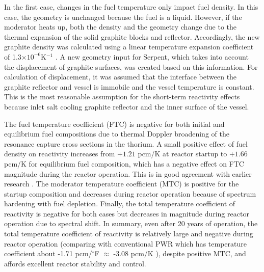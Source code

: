 In the first case, changes in the fuel temperature only impact fuel density. 
In this case, the geometry is unchanged because the fuel is a liquid. However, 
if the moderator heats up, both the density and the geometry change due to 
the thermal expansion of the solid graphite blocks and reflector. Accordingly, 
the new graphite density was calculated using a linear temperature expansion 
coefficient of 1.3$\times10^{-6}$K$^{-1}$ \cite{robertson_conceptual_1971}. A 
new geometry input for Serpent, which takes into account the displacement of 
graphite surfaces, was created based on this information. For calculation of 
displacement, it was assumed that the interface between the graphite reflector 
and vessel is immobile and the vessel temperature is constant. This 
is the most reasonable assumption for the short-term reactivity effects 
because inlet salt cooling graphite reflector and the inner surface of the 
vessel.

The fuel temperature coefficient (FTC) is negative for both initial and 
equilibrium fuel compositions due to thermal Doppler broadening of the 
resonance capture cross sections in the thorium. A small positive effect of 
fuel density on reactivity increases from $+1.21$ pcm/K at reactor startup to 
$+1.66$ pcm/K for equilibrium fuel composition, which has a negative effect on 
FTC magnitude during the reactor operation. This is in good agreement with 
earlier research \cite{robertson_conceptual_1971,park_whole_2015}. The 
moderator temperature coefficient (MTC) is positive for the startup 
composition and decreases during reactor operation because of spectrum 
hardening with fuel depletion. Finally, the total temperature coefficient of 
reactivity is negative for both cases but decreases in magnitude during 
reactor operation due to spectral shift. In summary, even after 20 years of 
operation, the total temperature coefficient of reactivity is relatively large 
and negative during reactor operation (comparing with conventional PWR which 
has temperature coefficient about -1.71 pcm/$^\circ$F $\approx$ -3.08 pcm/K 
\cite{forget_integral_2018}), despite positive MTC, and affords excellent 
reactor stability and control.

